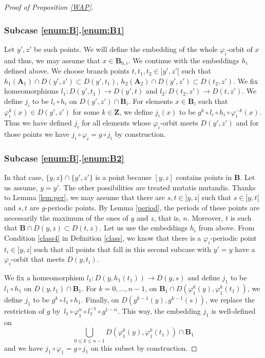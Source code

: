 \documentclass[JEP,XML,SOM,Unicode,NoFloatCountersInSection]{cedram}
\theoremstyle{plain}
\theoremstyle{definition}
\newcommand{\bA}{{\boldsymbol{A}}}
\newcommand{\bB}{{\boldsymbol{B}}}
\newcommand{\ZZ}{\mathbf{Z}}
\begin{document}
\begin{proof}[Proof of Proposition \ref{WAP}]
\subsubsection*{Subcase \ref{enum:B}.\ref{enum:B1}} Let $y',z'$ be such points. We will define the embedding of the whole $\varphi_i$-orbit of $x$ and thus, we may assume that $x\in \bB_{0,i}$. We continue with the embeddings $h_i$ defined above. We choose branch points $t,t_1,t_2\in{}]y',z'[$ such that $h_1(\bA_1)\cap D(y',z')\subset D(y',t_1)$, $h_2(\bA_2)\cap D(y',z')\subset D(t_2,z')$. We fix homeomorphisms $l_1\colon D(y',t_1)\to D(y',t)$ and $l_2\colon D(t_2,z')\to D(t,z')$. We define $j_i$ to be $l_i\circ h_i$ on $D(y',z')\cap\bB_i$. For elements $x\in \bB_i$ such that $\varphi_i^k(x)\in D(y',z')$ for some $k\in\ZZ$, we define $j_i(x)$ to be $g^k\circ l_i\circ h_i \circ\varphi_i^{-k}(x)$.
Thus we have defined $j_i$ for all elements whose $\varphi_i$-orbit meets $D(y',z')$ and for those points we have $j_i\circ\varphi_i=g\circ j_i$ by construction.

\subsubsection*{Subcase \ref{enum:B}.\ref{enum:B2}} In that case, $\{y,z\}\cap\{y',z'\}$ is a point because $[y,z]$ contains points in $\bB$. Let us assume, $y=y'$. The other possibilities are treated mutatis mutandis. Thanks to Lemma \ref{lem:per}, we may assume that there are $s,t\in{}]y,z[$ such that $s\in{}]y,t[$ and $s,t$ are $g$-periodic points. By Lemma \ref{period}, the periods of these points are necessarily the maximum of the ones of $y$ and $z$, that is, $n$. Moreover, $t$ is such that $\bB\cap D(y,z)\subset D(t,z)$. Let us use the embeddings $h_i$ from above. From Condition \eqref{class4} in Definition \ref{class}, we know that there is a $\varphi_i$-periodic point $t_i\in{}]y,z[$ such that all points that fall in this second subcase with $y'=y$ have a $\varphi_i$-orbit that meets $D(y,t_i)$.

We fix a homeomorphism $l_1\colon D(y, h_1(t_1)) \to D(y,s)$ and define $j_1$ to be \hbox{$l_1 \circ h_1$} on $D(y,t_1)\cap\bB_1$.
For $k = 0,\dots,n-1$, on $\bB_{1}\cap D(\varphi_1^k(y),\varphi_1^k(t_1))$, we define $j_1$ to be \hbox{$g^k \circ l_1 \circ h_1$}. Finally, on $D(g^{k-1}(y),g^{k-1}(s))$, we replace the restriction of $g$ by~\hbox{$l_1 \circ \varphi_1^n \circ l_1^{-1} \circ g^{1-n}$}. This way, the embedding $j_1$ is well-defined on
\[
\bigcup_{0\leq k\leq n-1} D(\varphi_1^k(y),\varphi_1^k(t_1))\cap \bB_1
\]
and we have $j_1\circ\varphi_1=g\circ j_1$ on this subset by construction.


\end{proof}
\end{document}
